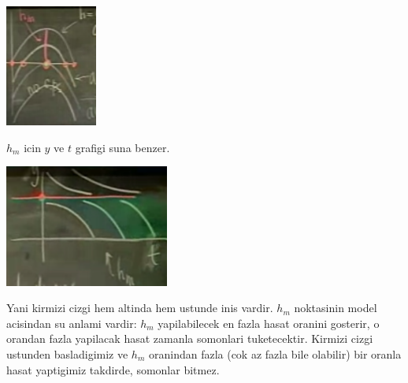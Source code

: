 \documentclass[12pt,fleqn]{article}\usepackage{../common}
\begin{document}
\includegraphics[height=4cm]{5_11.png}

$h_m$ icin $y$ ve $t$ grafigi suna benzer. 

\includegraphics[height=4cm]{5_12.png}

Yani kirmizi cizgi hem altinda hem ustunde inis vardir. $h_m$ noktasinin
model acisindan su anlami vardir: $h_m$ yapilabilecek en fazla hasat
oranini gosterir, o orandan fazla yapilacak hasat zamanla somonlari
tuketecektir. Kirmizi cizgi ustunden basladigimiz ve $h_m$ oranindan fazla
(cok az fazla bile olabilir) bir oranla hasat yaptigimiz takdirde, somonlar
bitmez.
\end{document}
